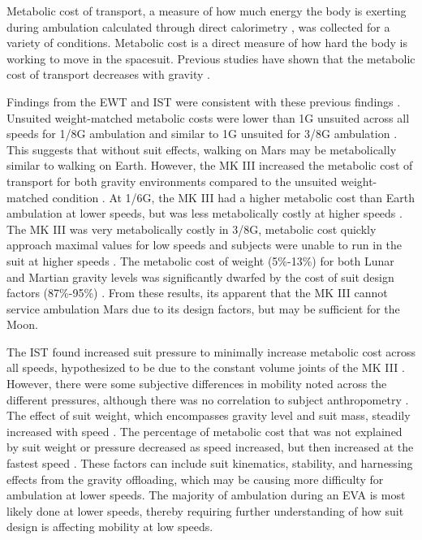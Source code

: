 \documentclass[defaultstyle,11pt]{comps}
\begin{document}
Metabolic cost of transport, a measure of how much energy the body is exerting during ambulation calculated through direct calorimetry \citep{Kenny2017}, was collected for a variety of conditions.
Metabolic cost is a direct measure of how hard the body is working to move in the spacesuit.
Previous studies have shown that the metabolic cost of transport decreases with gravity \citep{Grabowski2005}.

Findings from the EWT and IST were consistent with these previous findings \citep{Norcross2009, Norcross2010}.
Unsuited weight-matched metabolic costs were lower than 1G unsuited across all speeds for 1/8G ambulation and similar to 1G unsuited for 3/8G ambulation \citep{Norcross2009}.
This suggests that without suit effects, walking on Mars may be metabolically similar to walking on Earth.
However, the MK III increased the metabolic cost of transport for both gravity environments compared to the unsuited weight-matched condition \citep{Norcross2009}.
At 1/6G, the MK III had a higher metabolic cost than Earth ambulation at lower speeds, but was less metabolically costly at higher speeds \citep{Norcross2009, Norcross2010}.
The MK III was very metabolically costly in 3/8G, metabolic cost quickly approach maximal values for low speeds and subjects were unable to run in the suit at higher speeds \citep{Norcross2009}.
The metabolic cost of weight (5\%-13\%) for both Lunar and Martian gravity levels was significantly dwarfed by the cost of suit design factors (87\%-95\%) \citep{Norcross2009}.
From these results, its apparent that the MK III cannot service ambulation Mars due to its design factors, but may be sufficient for the Moon.

The IST found increased suit pressure to minimally increase metabolic cost across all speeds, hypothesized to be due to the constant volume joints of the MK III \citep{Norcross2010}.
However, there were some subjective differences in mobility noted across the different pressures, although there was no correlation to subject anthropometry \citep{Norcross2010}.
The effect of suit weight, which encompasses gravity level and suit mass, steadily increased with speed \citep{Norcross2010}.
The percentage of metabolic cost that was not explained by suit weight or pressure decreased as speed increased, but then increased at the fastest speed \citep{Norcross2010}.
These factors can include suit kinematics, stability, and harnessing effects from the gravity offloading, which may be causing more difficulty for ambulation at lower speeds.
The majority of ambulation during an EVA is most likely done at lower speeds, thereby requiring further understanding of how suit design is affecting mobility at low speeds.
\end{document}
